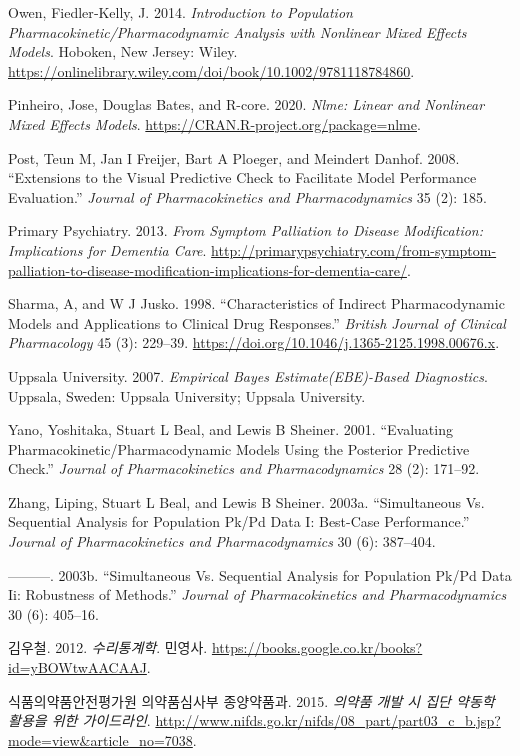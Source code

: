 \documentclass[
  10pt,
  krantz2,
  a4paper]{krantz}
\newlength{\cslhangindent}
\newenvironment{cslreferences}%
  {\setlength{\parindent}{0pt}%
  \everypar{\setlength{\hangindent}{\cslhangindent}}\ignorespaces}%
  {\par}
\theoremstyle{definition}
\theoremstyle{definition}
\theoremstyle{definition}
\theoremstyle{remark}
\begin{document}
\begin{cslreferences}
\leavevmode\hypertarget{ref-kelly}{}%
Owen, Fiedler‐Kelly, J. 2014. \emph{Introduction to Population Pharmacokinetic/Pharmacodynamic Analysis with Nonlinear Mixed Effects Models}. Hoboken, New Jersey: Wiley. \url{https://onlinelibrary.wiley.com/doi/book/10.1002/9781118784860}.

\leavevmode\hypertarget{ref-R-nlme}{}%
Pinheiro, Jose, Douglas Bates, and R-core. 2020. \emph{Nlme: Linear and Nonlinear Mixed Effects Models}. \url{https://CRAN.R-project.org/package=nlme}.

\leavevmode\hypertarget{ref-post2008extensions}{}%
Post, Teun M, Jan I Freijer, Bart A Ploeger, and Meindert Danhof. 2008. ``Extensions to the Visual Predictive Check to Facilitate Model Performance Evaluation.'' \emph{Journal of Pharmacokinetics and Pharmacodynamics} 35 (2): 185.

\leavevmode\hypertarget{ref-dementia}{}%
Primary Psychiatry. 2013. \emph{From Symptom Palliation to Disease Modification: Implications for Dementia Care}. \url{http://primarypsychiatry.com/from-symptom-palliation-to-disease-modification-implications-for-dementia-care/}.

\leavevmode\hypertarget{ref-sharma1998characteristics}{}%
Sharma, A, and W J Jusko. 1998. ``Characteristics of Indirect Pharmacodynamic Models and Applications to Clinical Drug Responses.'' \emph{British Journal of Clinical Pharmacology} 45 (3): 229--39. \url{https://doi.org/10.1046/j.1365-2125.1998.00676.x}.

\leavevmode\hypertarget{ref-uppsala}{}%
Uppsala University. 2007. \emph{Empirical Bayes Estimate(EBE)-Based Diagnostics}. Uppsala, Sweden: Uppsala University; Uppsala University.

\leavevmode\hypertarget{ref-yano2001evaluating}{}%
Yano, Yoshitaka, Stuart L Beal, and Lewis B Sheiner. 2001. ``Evaluating Pharmacokinetic/Pharmacodynamic Models Using the Posterior Predictive Check.'' \emph{Journal of Pharmacokinetics and Pharmacodynamics} 28 (2): 171--92.

\leavevmode\hypertarget{ref-zhang1}{}%
Zhang, Liping, Stuart L Beal, and Lewis B Sheiner. 2003a. ``Simultaneous Vs. Sequential Analysis for Population Pk/Pd Data I: Best-Case Performance.'' \emph{Journal of Pharmacokinetics and Pharmacodynamics} 30 (6): 387--404.

\leavevmode\hypertarget{ref-zhang2}{}%
---------. 2003b. ``Simultaneous Vs. Sequential Analysis for Population Pk/Pd Data Ii: Robustness of Methods.'' \emph{Journal of Pharmacokinetics and Pharmacodynamics} 30 (6): 405--16.

\leavevmode\hypertarget{ref-kim}{}%
김우철. 2012. \emph{수리통계학}. 민영사. \url{https://books.google.co.kr/books?id=yBOWtwAACAAJ}.

\leavevmode\hypertarget{ref-poppk}{}%
식품의약품안전평가원 의약품심사부 종양약품과. 2015. \emph{의약품 개발 시 집단 약동학 활용을 위한 가이드라인}. \url{http://www.nifds.go.kr/nifds/08_part/part03_c_b.jsp?mode=view\&article_no=7038}.
\end{cslreferences}

\printindex
\end{document}
